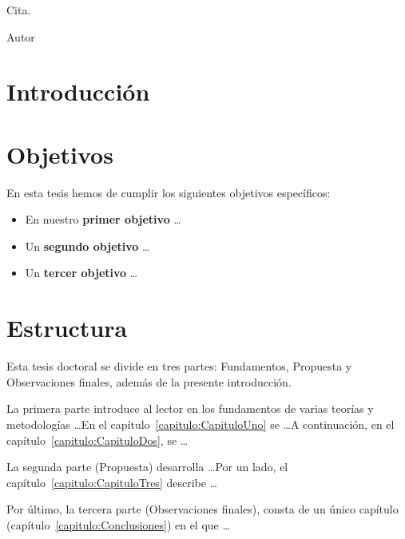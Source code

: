 
\epigraph{Cita.}{Autor}

\section{Introducción}\label{seccion:Introduccion}

\section{Objetivos}\label{seccion:Objetivos}

En esta tesis hemos de cumplir los siguientes objetivos específicos:

\begin{itemize}
	\item En nuestro \textbf{primer objetivo} \dots
	\item Un \textbf{segundo objetivo} \dots
    \item Un \textbf{tercer objetivo} \dots
\end{itemize}

\section{Estructura}\label{seccion:Estructura}

Esta tesis doctoral se divide en tres partes: Fundamentos, Propuesta y Observaciones finales, además de la presente introducción. 

La primera parte introduce al lector en los fundamentos de varias teorías y metodologías \dots En el capítulo~\ref{capitulo:CapituloUno} se \dots A continuación, en el capítulo~\ref{capitulo:CapituloDos}, se \dots

La segunda parte (Propuesta) desarrolla \dots Por un lado, el capítulo~\ref{capitulo:CapituloTres} describe \dots

Por último, la tercera parte (Observaciones finales), consta de un único capítulo (capítulo~\ref{capitulo:Conclusiones}) en el que \dots
